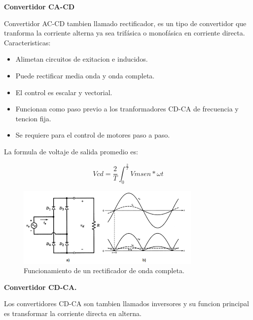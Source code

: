 \documentclass[spanish]{article}
\begin{document}
\begin{center}
\textbf{\LARGE{}Convertidor CA-CD}{\LARGE\par}
\par\end{center}

Convertidor AC-CD tambien llamado rectificador, es un tipo de convertidor
que tranforma la corriente alterna ya sea trif\'asica o monof\'asica en
corriente directa.\\

Caracteristicas:
\begin{itemize}
\item Alimetan circuitos de exitacion e inducidos.
\item Puede rectificar media onda y onda completa.
\item El control es escalar y vectorial.
\item Funcionan como paso previo a los tranformadores CD-CA de frecuencia
y tencion fija.
\item Se requiere para el control de motores paso a paso.
\end{itemize}
La formula de voltaje de salida promedio es:

\[
Vcd=\frac{2}{T}\int_{0}^{\frac{2}{T}}Vmsen*\omega t
\]

\begin{figure}[H]
\begin{centering}
\includegraphics[scale=0.5]{2.png}
\par\end{centering}
\begin{centering}
\caption{Funcionamiento de un rectificador de onda completa.}
\par\end{centering}
\end{figure}

\begin{center}
\textbf{\LARGE{}Convertidor CD-CA.}{\LARGE\par}
\par\end{center}

Los convertidores CD-CA son tambien llamados inversores y su funcion
principal es transformar la corriente directa en alterna.\\
\end{document}
